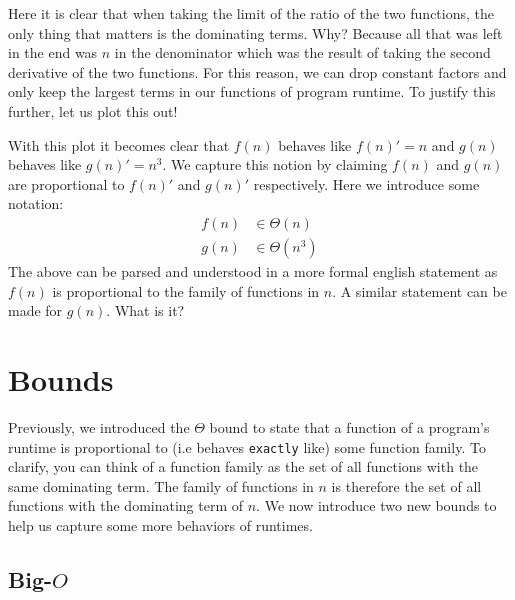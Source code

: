 \documentclass{article}
\begin{document}
Here it is clear that when taking the limit of the ratio of the two functions, the only thing that matters is the dominating terms. Why? Because all that was left in the end was $n$ in the denominator which was the result of taking the second derivative of the two functions. For this reason, we can drop constant factors and only keep the largest terms in our functions of program runtime. To justify this further, let us plot this out!
\begin{center}
\end{center}
With this plot it becomes clear that $f(n)$ behaves like $f(n)' = n$ and $g(n)$ behaves like $g(n)' = n^3$. We capture this notion by claiming $f(n)$ and $g(n)$ are proportional to $f(n)'$ and $g(n)'$ respectively. Here we introduce some notation:
\begin{align*}
    f(n) &\in \Theta(n) \\
    g(n) &\in \Theta(n^3)
\end{align*}
The above can be parsed and understood in a more formal english statement as $f(n)$ is proportional to the family of functions in $n$. A similar statement can be made for $g(n)$. What is it?

\section{Bounds}
Previously, we introduced the $\Theta$ bound to state that a function of a program's runtime is proportional to (i.e behaves \texttt{exactly} like) some function family. To clarify, you can think of a function family as the set of all functions with the same dominating term. The family of functions in $n$ is therefore the set of all functions with the dominating term of $n$. We now introduce two new bounds to help us capture some more behaviors of runtimes.
\subsection{Big-$O$}


%
%
%
\end{document}
